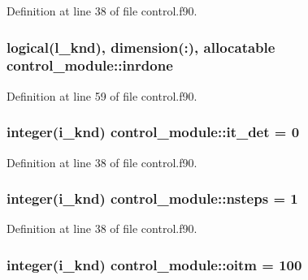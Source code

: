 Definition at line 38 of file control.\-f90.

\hypertarget{classcontrol__module_a800d3f9715c61376ad1a2d5b5b77e116}{
\subsubsection[{inrdone}]{\setlength{\rightskip}{0pt plus 5cm}logical(l\-\_\-knd), dimension(\-:), allocatable control\-\_\-module\-::inrdone}}\label{classcontrol__module_a800d3f9715c61376ad1a2d5b5b77e116}


Definition at line 59 of file control.\-f90.

\hypertarget{classcontrol__module_a47222ebdff0b8cbd932da30c43572177}{
\subsubsection[{it\-\_\-det}]{\setlength{\rightskip}{0pt plus 5cm}integer(i\-\_\-knd) control\-\_\-module\-::it\-\_\-det = 0}}\label{classcontrol__module_a47222ebdff0b8cbd932da30c43572177}


Definition at line 38 of file control.\-f90.

\hypertarget{classcontrol__module_a94e5569686ecc448c8fb807946cf95fb}{
\subsubsection[{nsteps}]{\setlength{\rightskip}{0pt plus 5cm}integer(i\-\_\-knd) control\-\_\-module\-::nsteps = 1}}\label{classcontrol__module_a94e5569686ecc448c8fb807946cf95fb}


Definition at line 38 of file control.\-f90.

\hypertarget{classcontrol__module_a99fddac51dc4299027ab5afd97c5c7ea}{
\subsubsection[{oitm}]{\setlength{\rightskip}{0pt plus 5cm}integer(i\-\_\-knd) control\-\_\-module\-::oitm = 100}}\label{classcontrol__module_a99fddac51dc4299027ab5afd97c5c7ea}


